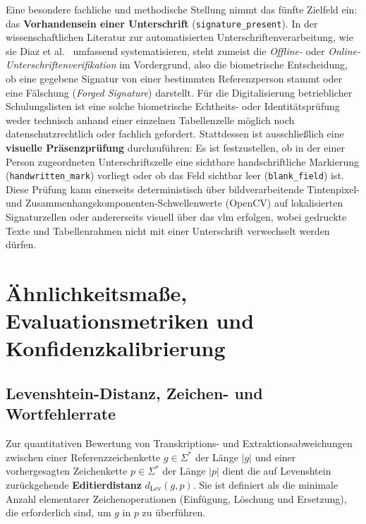 Eine besondere fachliche und methodische Stellung nimmt das fünfte Zielfeld ein: das \textbf{Vorhandensein einer Unterschrift} (\texttt{signature\_present}). In der wissenschaftlichen Literatur zur automatisierten Unterschriftenverarbeitung, wie sie Diaz et al.~\cite{Diaz2019Signature} umfassend systematisieren, steht zumeist die \emph{Offline-} oder \emph{Online-Unterschriftenverifikation} im Vordergrund, also die biometrische Entscheidung, ob eine gegebene Signatur von einer bestimmten Referenzperson stammt oder eine Fälschung (\emph{Forged Signature}) darstellt. Für die Digitalisierung betrieblicher Schulungslisten ist eine solche biometrische Echtheits- oder Identitätsprüfung weder technisch anhand einer einzelnen Tabellenzelle möglich noch datenschutzrechtlich oder fachlich gefordert. Stattdessen ist ausschließlich eine \textbf{visuelle Präsenzprüfung} durchzuführen: Es ist festzustellen, ob in der einer Person zugeordneten Unterschriftszelle eine sichtbare handschriftliche Markierung (\texttt{handwritten\_mark}) vorliegt oder ob das Feld sichtbar leer (\texttt{blank\_field}) ist. Diese Prüfung kann einerseits deterministisch über bildverarbeitende Tintenpixel- und Zusammenhangskomponenten-Schwellenwerte (OpenCV) auf lokalisierten Signaturzellen oder andererseits visuell über das \ac{vlm} erfolgen, wobei gedruckte Texte und Tabellenrahmen nicht mit einer Unterschrift verwechselt werden dürfen.

\section{Ähnlichkeitsmaße, Evaluationsmetriken und Konfidenzkalibrierung}
\label{sec:grundlagen-metriken}

\subsection{Levenshtein-Distanz, Zeichen- und Wortfehlerrate}
\label{subsec:levenshtein-cer-wer}

Zur quantitativen Bewertung von Transkriptions- und Extraktionsabweichungen zwischen einer Referenzzeichenkette $g \in \Sigma^*$ der Länge $|g|$ und einer vorhergesagten Zeichenkette $p \in \Sigma^*$ der Länge $|p|$ dient die auf Levenshtein~\cite{Levenshtein1966Binary} zurückgehende \textbf{Editierdistanz} $d_{\mathrm{Lev}}(g, p)$. Sie ist definiert als die minimale Anzahl elementarer Zeichenoperationen (Einfügung, Löschung und Ersetzung), die erforderlich sind, um $g$ in $p$ zu überführen.

